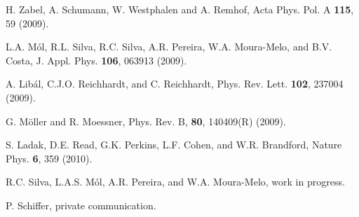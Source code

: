 \documentclass[aps,prb,twocolumn,floatfix,showpacs,amsmath,amssymb]{revtex4}
\begin{document}
\begin{thebibliography}{2dspins}
 H. Zabel, A. Schumann, W. Westphalen and A. Remhof, Acta Phys. Pol. A
\textbf{115}, 59 (2009).

 L.A. M\'{o}l, R.L. Silva, R.C. Silva, A.R.
Pereira, W.A. Moura-Melo, and B.V. Costa, J. Appl. Phys.
\textbf{106}, 063913 (2009).

 A. Lib\'{a}l, C.J.O. Reichhardt, and C.
Reichhardt, Phys. Rev. Lett. \textbf{102}, 237004 (2009).

 G. M\"{o}ller and R. Moessner, Phys. Rev. B, \textbf{80}, 140409(R) (2009).

 S. Ladak, D.E. Read, G.K. Perkins, L.F. Cohen,
and W.R. Brandford, Nature Phys. \textbf{6}, 359 (2010).

 R.C. Silva, L.A.S. M\'ol, A.R. Pereira, and W.A. Moura-Melo, work in progress.

 P. Schiffer, private communication.


\end{thebibliography}
\end{document}
